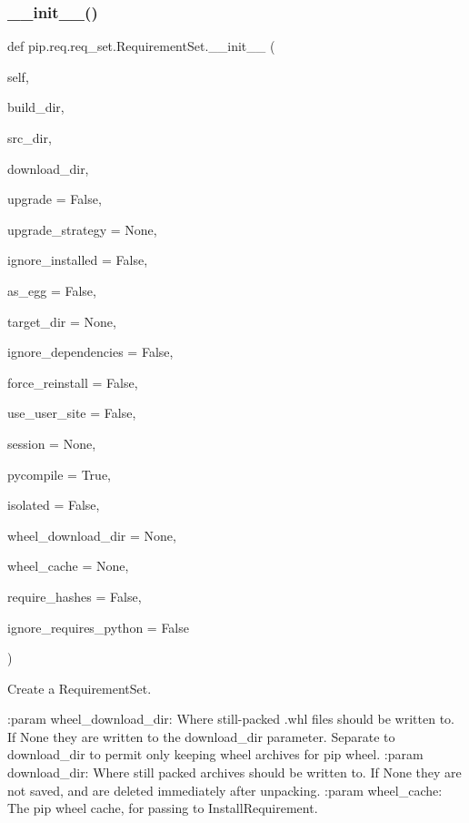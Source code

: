 \subsubsection{\texorpdfstring{\+\_\+\+\_\+init\+\_\+\+\_\+()}{\_\_init\_\_()}}
{\footnotesize\ttfamily def pip.\+req.\+req\+\_\+set.\+Requirement\+Set.\+\_\+\+\_\+init\+\_\+\+\_\+ (\begin{DoxyParamCaption}\item[{}]{self,  }\item[{}]{build\+\_\+dir,  }\item[{}]{src\+\_\+dir,  }\item[{}]{download\+\_\+dir,  }\item[{}]{upgrade = {\ttfamily False},  }\item[{}]{upgrade\+\_\+strategy = {\ttfamily None},  }\item[{}]{ignore\+\_\+installed = {\ttfamily False},  }\item[{}]{as\+\_\+egg = {\ttfamily False},  }\item[{}]{target\+\_\+dir = {\ttfamily None},  }\item[{}]{ignore\+\_\+dependencies = {\ttfamily False},  }\item[{}]{force\+\_\+reinstall = {\ttfamily False},  }\item[{}]{use\+\_\+user\+\_\+site = {\ttfamily False},  }\item[{}]{session = {\ttfamily None},  }\item[{}]{pycompile = {\ttfamily True},  }\item[{}]{isolated = {\ttfamily False},  }\item[{}]{wheel\+\_\+download\+\_\+dir = {\ttfamily None},  }\item[{}]{wheel\+\_\+cache = {\ttfamily None},  }\item[{}]{require\+\_\+hashes = {\ttfamily False},  }\item[{}]{ignore\+\_\+requires\+\_\+python = {\ttfamily False} }\end{DoxyParamCaption})}

\begin{DoxyVerb}Create a RequirementSet.

:param wheel_download_dir: Where still-packed .whl files should be
    written to. If None they are written to the download_dir parameter.
    Separate to download_dir to permit only keeping wheel archives for
    pip wheel.
:param download_dir: Where still packed archives should be written to.
    If None they are not saved, and are deleted immediately after
    unpacking.
:param wheel_cache: The pip wheel cache, for passing to
    InstallRequirement.
\end{DoxyVerb}
 

